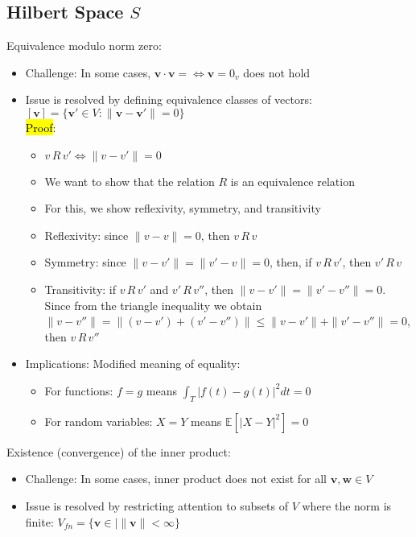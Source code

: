 \subsection*{Hilbert Space $S$}
Equivalence modulo norm zero:
\begin{itemize}
    \item Challenge: In some cases, $\boldsymbol{v} \cdot \boldsymbol{v} = \Leftrightarrow \boldsymbol{v} = 0_v$ does not hold
    \item Issue is resolved by defining equivalence classes of vectors: $[\boldsymbol{v}] = \{\boldsymbol{v}' \in V : \|\boldsymbol{v} - \boldsymbol{v}'\| = 0\}$\\
    \hl{Proof}:
    \begin{itemize}
        \item $v \, R \, v' \iff \|v - v'\| = 0$
        \item We want to show that the relation $R$ is an equivalence relation
        \item For this, we show reflexivity, symmetry, and transitivity
        \item Reflexivity: since $\|v - v\| = 0$, then $v \, R \, v$
        \item Symmetry: since $\|v - v'\| = \|v' - v\| = 0$, then, if $v \, R \, v'$, then $v' \, R \, v$
        \item Transitivity: if $v \, R \, v'$ and $v' \, R \, v''$, then $\|v - v'\| = \|v' - v''\| = 0$. Since from the triangle inequality we obtain
        $
        \|v - v''\| = \|(v - v') + (v' - v'')\| \leq \|v - v'\| + \|v' - v''\| = 0
        $, then $v \, R \, v''$
    \end{itemize}
    \item Implications: Modified meaning of equality: 
    \begin{itemize}
        \item For functions: $f = g$ means $\int_T |f(t) - g(t)|^2 dt = 0$
        \item For random variables: $X = Y$ means $\mathbb{E}[|X - Y|^2] = 0$
    \end{itemize}
\end{itemize} 

Existence (convergence) of the inner product:
\begin{itemize}
    \item Challenge: In some cases, inner product does not exist for all $\boldsymbol{v}, \boldsymbol{w} \in V$
    \item Issue is resolved by restricting attention to subsets of $V$ where the norm is finite: $V_{fn} = \{ \boldsymbol{v} \in | \| \boldsymbol{v} \| < \infty \}$
\end{itemize}


